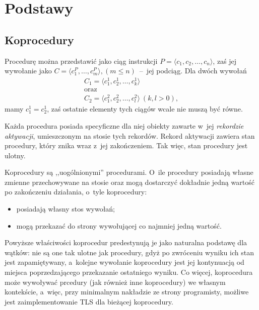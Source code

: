 \documentclass{mwart}
\begin{document}
\newpage
\section{Podstawy}

\subsection{Koprocedury}
%
\indent
	Procedurę można przedstawić jako ciąg instrukcji $P=\langle c_1,c_2,\ldots ,c_n\rangle$, zaś jej wywołanie jako 
	$C=\langle c_1^P,\ldots,c_m^P\rangle, \mathrm{ } (m \leq n)$~--~jej
	podciąg. Dla dwóch wywołań 
	\begin{displaymath}
	\begin{array}{l}
	C_1= \langle c_1^1,c_2^1,\ldots ,c_k^1 \rangle \\
	\mathrm{oraz}\\
	C_2= \langle c_1^2,c_2^2,\ldots ,c_l^2 \rangle \mathrm{~} (k,l > 0), 
	\end{array}
	\end{displaymath}
	mamy $c_1^1 = c_2^1$, zaś ostatnie elementy tych ciągów wcale nie muszą być równe.
\par
\indent
	Każda procedura posiada specyficzne dla niej obiekty zawarte w~jej \emph{rekordzie aktywacji},
	umieszczonym na stosie tych rekordów. Rekord aktywacji zawiera stan procedury, który znika wraz 
	z~jej zakończeniem. Tak więc, stan procedury jest ulotny.
\par
	Koprocedury są ,,uogólnionymi'' procedurami. O~ile procedury posiadają własne zmienne
	przechowywane na stosie oraz mogą dostarczyć dokładnie jedną wartość po zakończeniu
	działania, o~tyle koprocedury:
	\begin{itemize}
	\item posiadają własny stos wywołań;
	\item mogą przekazać do strony wywołującej co najmniej jedną wartość.
	\end{itemize}
	Powyższe właściwości koprocedur predestynują je jako naturalna podstawę dla wątków:
	nie są one tak ulotne jak procedury, gdyż po zwróceniu wyniku ich stan jest zapamiętywany,
	a~kolejne wywołanie koprocedury jest jej kontynuacją od miejsca poprzedzającego przekazanie
	ostatniego wyniku. Co więcej, koprocedura może wywoływać prcedury (jak również inne koprocedury)
	we własnym kontekście, a~więc, przy minimalnym nakładzie ze strony programisty, możliwe jest
	zaimplementowanie TLS dla bieżącej koprocedury.
\par
\end{document}
